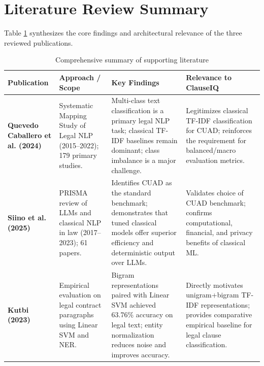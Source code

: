 \section{Literature Review Summary}
\label{sec:literature_summary}
Table \ref{tab:lit_summary} synthesizes the core findings and architectural relevance of the three reviewed publications.

\begin{table}[h!]
\centering
\small
\begin{tabularx}{\textwidth}{p{2.8cm}p{3.2cm}p{4.2cm}X}
\toprule
\textbf{Publication} & \textbf{Approach / Scope} & \textbf{Key Findings} & \textbf{Relevance to ClauseIQ} \\
\midrule
\textbf{Quevedo Caballero et al. (2024)} \cite{quevedo2024} & 
Systematic Mapping Study of Legal NLP (2015--2022); 179 primary studies. & 
Multi-class text classification is a primary legal NLP task; classical TF-IDF baselines remain dominant; class imbalance is a major challenge. & 
Legitimizes classical TF-IDF classification for CUAD; reinforces the requirement for balanced/macro evaluation metrics. \\
\midrule
\textbf{Siino et al. (2025)} \cite{siino2025} & 
PRISMA review of LLMs and classical NLP in law (2017--2023); 61 papers. & 
Identifies CUAD as the standard benchmark; demonstrates that tuned classical models offer superior efficiency and deterministic output over LLMs. & 
Validates choice of CUAD benchmark; confirms computational, financial, and privacy benefits of classical ML. \\
\midrule
\textbf{Kutbi (2023)} \cite{kutbi2023} & 
Empirical evaluation on legal contract paragraphs using Linear SVM and NER. & 
Bigram representations paired with Linear SVM achieved 63.76\% accuracy on legal text; entity normalization reduces noise and improves accuracy. & 
Directly motivates unigram+bigram TF-IDF representations; provides comparative empirical baseline for legal clause classification. \\
\bottomrule
\end{tabularx}
\caption{Comprehensive summary of supporting literature}
\label{tab:lit_summary}
\end{table}

